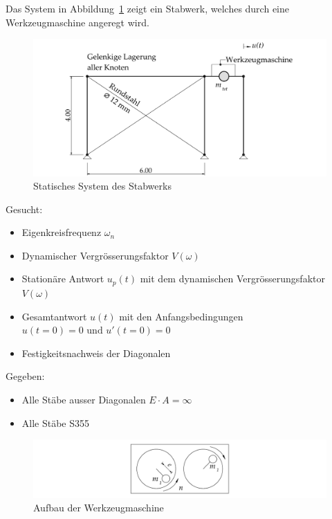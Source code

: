 \documentclass[
  letterpaper,
  DIV=11]{scrreprt}
\providecommand{\tightlist}{%
  \setlength{\itemsep}{0pt}\setlength{\parskip}{0pt}}\usepackage{longtable,booktabs,array}
\begin{document}
Das System in Abbildung~\ref{fig-ems_ges_system_maschine} zeigt ein
Stabwerk, welches durch eine Werkzeugmaschine angeregt wird.

\begin{figure}[H]

{\centering \includegraphics{index_files/mediabag/bilder/aufgabe_ems_ges_system.pdf}

}

\caption{\label{fig-ems_ges_system_maschine}Statisches System des
Stabwerks}

\end{figure}

Gesucht:

\begin{itemize}
\tightlist
\item
  Eigenkreisfrequenz \(\omega_n\)
\item
  Dynamischer Vergrösserungsfaktor \(V(\omega)\)
\item
  Stationäre Antwort \(u_p(t)\) mit dem dynamischen Vergrösserungsfaktor
  \(V(\omega)\)
\item
  Gesamtantwort \(u(t)\) mit den Anfangsbedingungen
  \(u(t=0) = 0 \text{ und } u'(t=0)=0\)
\item
  Festigkeitsnachweis der Diagonalen
\end{itemize}

Gegeben:

\begin{itemize}
\tightlist
\item
  Alle Stäbe ausser Diagonalen \(E\cdot A = \infty\)
\item
  Alle Stäbe S355
\end{itemize}

\begin{figure}[H]

{\centering \includegraphics{index_files/mediabag/bilder/aufgabe_ems_werkzeugmaschine.pdf}

}

\caption{\label{fig-ems_ges_maschine}Aufbau der Werkzeugmaschine}

\end{figure}
\end{document}

